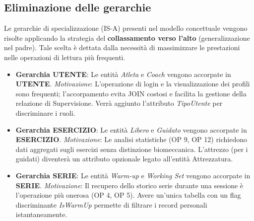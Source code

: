 \documentclass[12pt]{report}
\begin{document}
\subsection{Eliminazione delle gerarchie}
Le gerarchie di specializzazione (IS-A) presenti nel modello concettuale vengono risolte applicando la strategia del \textbf{collassamento verso l'alto} (generalizzazione nel padre). Tale scelta è dettata dalla necessità di massimizzare le prestazioni nelle operazioni di lettura più frequenti.

\begin{itemize}
    \item \textbf{Gerarchia UTENTE}: Le entità \textit{Atleta} e \textit{Coach} vengono accorpate in \textbf{UTENTE}. 
    \textit{Motivazione}: L'operazione di login e la visualizzazione dei profili sono frequenti; l'accorpamento evita JOIN costosi e facilita la gestione della relazione di Supervisione. Verrà aggiunto l'attributo \textit{TipoUtente} per discriminare i ruoli.
    
    \item \textbf{Gerarchia ESERCIZIO}: Le entità \textit{Libero} e \textit{Guidato} vengono accorpate in \textbf{ESERCIZIO}. 
    \textit{Motivazione}: Le analisi statistiche (OP 9, OP 12) richiedono dati aggregati sugli esercizi senza distinzione biomeccanica. L'attrezzo (per i guidati) diventerà un attributo opzionale legato all'entità Attrezzatura.
    
    \item \textbf{Gerarchia SERIE}: Le entità \textit{Warm-up} e \textit{Working Set} vengono accorpate in \textbf{SERIE}. 
    \textit{Motivazione}: Il recupero dello storico serie durante una sessione è l'operazione più onerosa (OP 4, OP 5). Avere un'unica tabella con un flag discriminante \textit{IsWarmUp} permette di filtrare i record personali istantaneamente.
\end{itemize}
\end{document}
